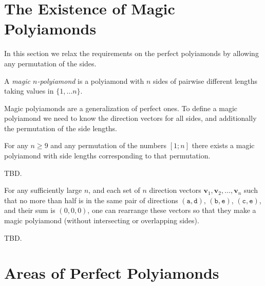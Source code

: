 \documentclass[utf8]{bjmc}
\begin{document}
\section{The Existence of Magic Polyiamonds}

In this section we relax the requirements on the perfect polyiamonds by allowing any permutation of the sides. 

\begin{definition}
A {\em magic $n$-polyiamond} is a polyiamond with $n$ sides of pairwise different lengths 
taking values in $\{ 1,\ldots n\}$. 
\end{definition}

Magic polyiamonds are a generalization of perfect ones. To define a 
magic polyiamond we need to know
the direction vectors for all sides, and additionally the permutation 
of the side lengths. 


\begin{theorem}
For any $n \geq 9$ and any permutation 
of the numbers $[1;n]$ there exists a 
magic polyiamond with side lengths corresponding to that permutation. 
\end{theorem}

TBD.


\begin{theorem}
For any sufficiently large $n$, and each set of 
$n$ direction vectors $\mathbf{v}_1, \mathbf{v}_2, \ldots, \mathbf{v}_n$
such that no more than half is in the same pair of directions 
$(\mathtt{a}, \mathtt{d})$, $(\mathtt{b}, \mathtt{e})$, $(\mathtt{c}, \mathtt{e})$, 
and their sum is $(0,0,0)$, one can rearrange these vectors so that 
they make a magic polyiamond (without intersecting or overlapping sides).
\end{theorem}

TBD.



\section{Areas of Perfect Polyiamonds}

\end{document}
